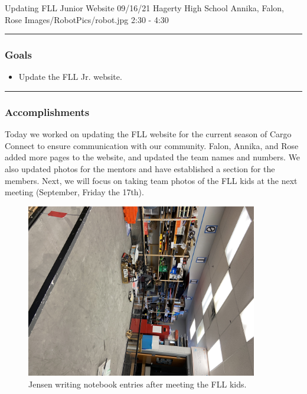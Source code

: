 \insertmeeting 
	{Updating FLL Junior Website} 
	{09/16/21}
	{Hagerty High School}
	{Annika, Falon, Rose}
	{Images/RobotPics/robot.jpg}
	{2:30 - 4:30}
	
\noindent\hfil\rule{\textwidth}{.4pt}\hfil
\subsubsection*{Goals}
\begin{itemize}
    \item Update the FLL Jr. website.

\end{itemize} 

\noindent\hfil\rule{\textwidth}{.4pt}\hfil

\subsubsection*{Accomplishments}
Today we worked on updating the FLL website for the current season of Cargo Connect to ensure communication with our community. Falon, Annika, and Rose added more pages to the website, and updated the team names and numbers. We also updated photos for the mentors and have established a section for the members. Next, we will focus on taking team photos of the FLL kids at the next meeting (September, Friday the 17th).

\begin{figure}[htp]
\centering
\includegraphics[width=0.9\textwidth, angle=0]{Meetings/September/09-16-21/IMG_8833 - Falon Jones.JPG}
\caption{Jensen writing notebook entries after meeting the FLL kids.}
\label{fig:pic1}
\end{figure}

